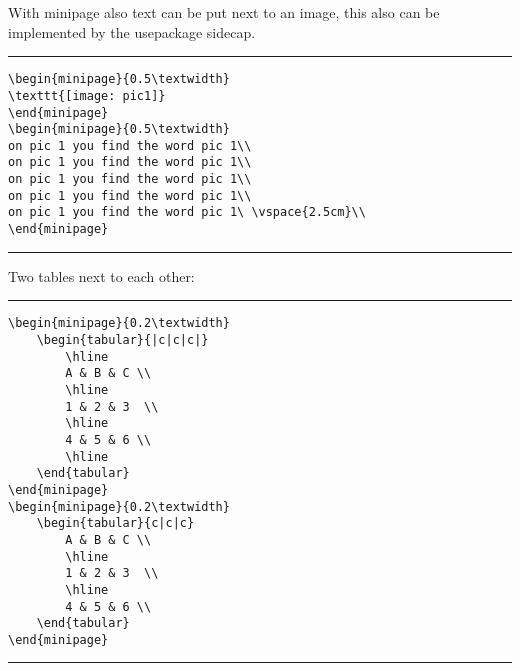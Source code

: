 With minipage also text can be put next to an image, this also can be implemented by the usepackage sidecap.
\noindent\vspace{1em}\hrule
\begin{verbatim}
\begin{minipage}{0.5\textwidth}
\texttt{[image: pic1]}
\end{minipage}
\begin{minipage}{0.5\textwidth}
on pic 1 you find the word pic 1\\
on pic 1 you find the word pic 1\\
on pic 1 you find the word pic 1\\
on pic 1 you find the word pic 1\\
on pic 1 you find the word pic 1\ \vspace{2.5cm}\\
\end{minipage}
\end{verbatim}
\noindent\hrule\vspace{1em}

Two tables next to each other:
\noindent\vspace{1em}\hrule
\begin{verbatim}
\begin{minipage}{0.2\textwidth}
	\begin{tabular}{|c|c|c|}
		\hline
		A & B & C \\
		\hline
		1 & 2 & 3  \\
		\hline 
		4 & 5 & 6 \\
		\hline
	\end{tabular}
\end{minipage}
\begin{minipage}{0.2\textwidth}
	\begin{tabular}{c|c|c}
		A & B & C \\
		\hline
		1 & 2 & 3  \\
		\hline 
		4 & 5 & 6 \\
	\end{tabular}
\end{minipage}
\end{verbatim}
\noindent\hrule\vspace{1em}